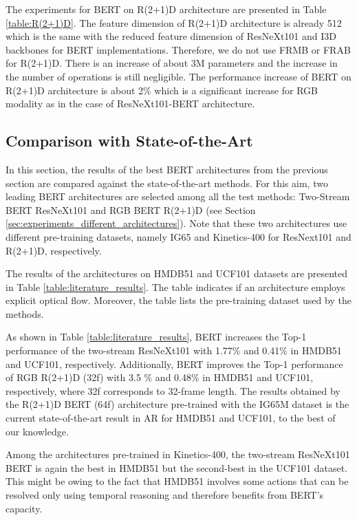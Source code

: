 \documentclass[runningheads]{llncs}
\begin{document}
The experiments for BERT on R(2+1)D architecture are presented in Table \ref{table:R(2+1)D}. The feature dimension of R(2+1)D architecture is already 512 which is the same with the reduced feature dimension of ResNeXt101 and I3D backbones for BERT implementations. Therefore, we do not use FRMB or FRAB for R(2+1)D. There is an increase of about 3M parameters and the increase in the number of operations is still negligible. The performance increase of BERT on R(2+1)D architecture is about 2\% which is a significant increase for RGB modality as in the case of ResNeXt101-BERT architecture. 

\subsection{Comparison with State-of-the-Art}
\label{sec:experiments_state_of_the_art}
In this section, the results of the best BERT architectures from the previous section are compared against the state-of-the-art methods. For this aim, two leading BERT architectures are selected among all the test methods: Two-Stream BERT ResNeXt101 and RGB BERT R(2+1)D (see Section \ref{sec:experiments_different_architectures}). Note that these two architectures use different pre-training datasets, namely IG65 and Kinetics-400 for ResNext101 and R(2+1)D, respectively. 

The results of the architectures on HMDB51 and UCF101 datasets are presented in Table \ref{table:literature_results}. The table indicates if an architecture employs explicit optical flow. Moreover, the table lists the pre-training dataset used by the methods. 


As shown in Table \ref{table:literature_results}, BERT increases the Top-1 performance of the two-stream ResNeXt101 with 1.77\% and 0.41\% in HMDB51 and UCF101, respectively. Additionally, BERT improves the Top-1 performance of RGB R(2+1)D (32f) with 3.5 \% and 0.48\% in HMDB51 and UCF101, respectively, where 32f corresponds to 32-frame length. The results obtained by the R(2+1)D BERT (64f) architecture pre-trained with the IG65M dataset is the current state-of-the-art result in AR for HMDB51 and UCF101, to the best of our knowledge. 

Among the architectures pre-trained in Kinetics-400, the two-stream ResNeXt101 BERT is again the best in HMDB51 but the second-best in the UCF101 dataset. This might be owing to the fact that HMDB51 involves some actions that can be resolved only using temporal reasoning and therefore benefits from BERT's capacity.   
\end{document}
